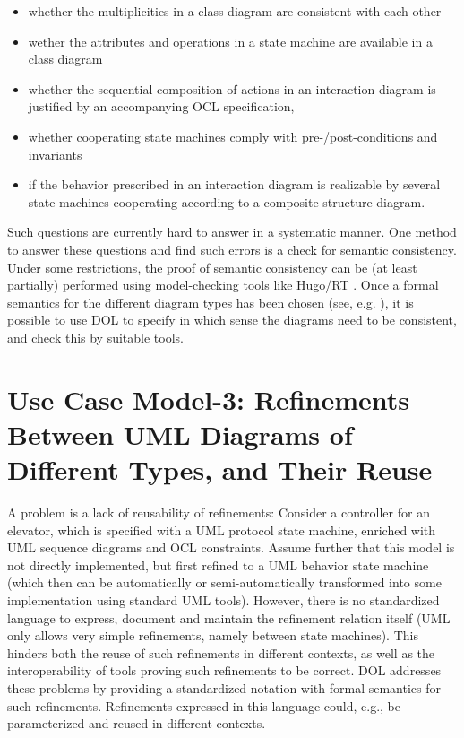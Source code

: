 \documentclass[10pt,fleqn,%
\ifpretendfinal
final%
\else
draft%
\fi,
]{scrreprt}
\begin{document}
\begin{itemize}
\item whether the multiplicities in a class diagram are consistent with each other
\item wether the attributes and operations in a state machine are
available in a class diagram
\item	  whether the sequential composition of actions in an interaction diagram is justified by an accompanying OCL specification,
\item 	whether cooperating state machines comply with pre-/post-conditions and invariants
\item 	if the behavior prescribed in an interaction diagram is realizable by several state machines cooperating according to a composite structure diagram.
\end{itemize}
Such questions are currently hard to answer in a systematic manner. One method to answer these questions and find such errors is a check for semantic 
consistency. Under some restrictions, the proof of semantic consistency can be (at least partially) performed using model-checking tools like Hugo/RT \cite{knapp-wuttke:models06wsh:2007}. 
Once a formal semantics for the different diagram types has been chosen (see, e.g. \cite{knapp-mossakowski-roggenbach:corr:2014}), it is possible to use DOL to specify in which 
sense the diagrams need to be consistent, and check this by suitable tools.

\section{Use Case Model-3: Refinements Between UML Diagrams of Different Types, and Their Reuse}
A problem is a lack of reusability of refinements: Consider a controller for an elevator, which is specified with a UML protocol state machine, enriched with UML 
sequence diagrams and OCL constraints. Assume further that this model is not directly implemented, but first refined to a UML behavior state machine (which then 
can be automatically or semi-automatically transformed into some implementation using standard UML tools). However, there is no standardized language to 
express, document and maintain the refinement relation itself (UML only allows very simple refinements, namely between state machines). This hinders both the 
reuse of such refinements in different contexts, as well as the interoperability of tools proving such refinements to be correct. DOL  
addresses these problems by providing a standardized notation with formal semantics for such refinements. Refinements expressed in this language could, e.g., be 
parameterized and reused in different contexts.
\end{document}
